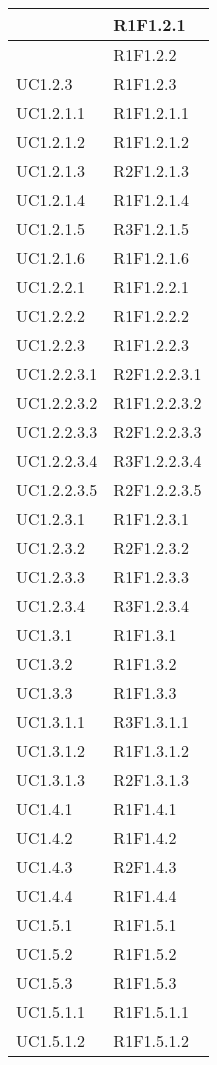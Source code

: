 \begin{longtable}{|>{\centering}m{5cm}|m{5cm}<{\centering}|}
{UC1.2.1}&{R1F1.2.1}\\ \hline
{UC1.2.2}&{R1F1.2.2}\\ \hline
{UC1.2.3}&{R1F1.2.3}\\ \hline
{UC1.2.1.1}&{R1F1.2.1.1}\\ \hline
{UC1.2.1.2}&{R1F1.2.1.2}\\ \hline
{UC1.2.1.3}&{R2F1.2.1.3}\\ \hline
{UC1.2.1.4}&{R1F1.2.1.4}\\ \hline
{UC1.2.1.5}&{R3F1.2.1.5}\\ \hline
{UC1.2.1.6}&{R1F1.2.1.6}\\ \hline
{UC1.2.2.1}&{R1F1.2.2.1}\\ \hline
{UC1.2.2.2}&{R1F1.2.2.2}\\ \hline
{UC1.2.2.3}&{R1F1.2.2.3}\\ \hline
{UC1.2.2.3.1}&{R2F1.2.2.3.1}\\ \hline
{UC1.2.2.3.2}&{R1F1.2.2.3.2}\\ \hline
{UC1.2.2.3.3}&{R2F1.2.2.3.3}\\ \hline
{UC1.2.2.3.4}&{R3F1.2.2.3.4}\\ \hline
{UC1.2.2.3.5}&{R2F1.2.2.3.5}\\ \hline
{UC1.2.3.1}&{R1F1.2.3.1}\\ \hline
{UC1.2.3.2}&{R2F1.2.3.2}\\ \hline
{UC1.2.3.3}&{R1F1.2.3.3}\\ \hline
{UC1.2.3.4}&{R3F1.2.3.4}\\ \hline
{UC1.3.1}&{R1F1.3.1}\\ \hline
{UC1.3.2}&{R1F1.3.2}\\ \hline
{UC1.3.3}&{R1F1.3.3}\\ \hline
{UC1.3.1.1}&{R3F1.3.1.1}\\ \hline
{UC1.3.1.2}&{R1F1.3.1.2}\\ \hline
{UC1.3.1.3}&{R2F1.3.1.3}\\ \hline
{UC1.4.1}&{R1F1.4.1}\\ \hline
{UC1.4.2}&{R1F1.4.2}\\ \hline
{UC1.4.3}&{R2F1.4.3}\\ \hline
{UC1.4.4}&{R1F1.4.4}\\ \hline
{UC1.5.1}&{R1F1.5.1}\\ \hline
{UC1.5.2}&{R1F1.5.2}\\ \hline
{UC1.5.3}&{R1F1.5.3}\\ \hline
{UC1.5.1.1}&{R1F1.5.1.1}\\ \hline
{UC1.5.1.2}&{R1F1.5.1.2}\\ \hline

\end{longtable}
